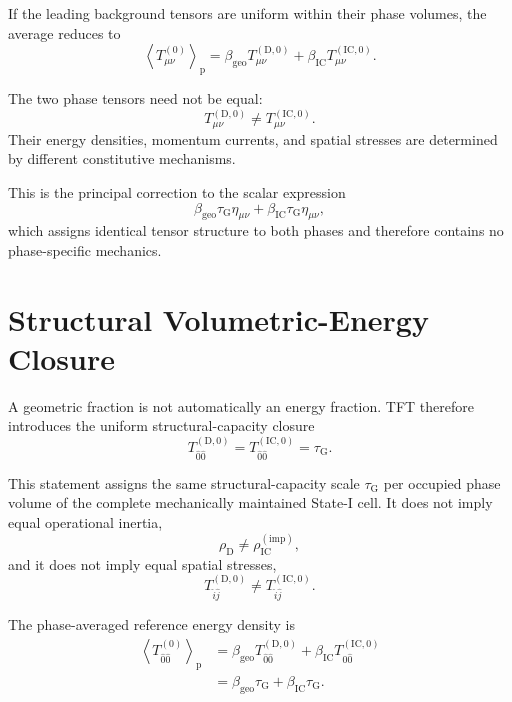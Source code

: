 If the leading background tensors are uniform within their phase volumes, the average reduces to
\begin{equation}
    \left\langle T_{\mu\nu}^{(0)}\right\rangle_{\mathrm{p}} = \beta_{\mathrm{geo}} T_{\mu\nu}^{(\mathrm{D},0)} + \beta_{\mathrm{IC}} T_{\mu\nu}^{(\mathrm{IC},0)}.
\end{equation}

The two phase tensors need not be equal:
\begin{equation}
    T_{\mu\nu}^{(\mathrm{D},0)} \neq T_{\mu\nu}^{(\mathrm{IC},0)}.
\end{equation}
Their energy densities, momentum currents, and spatial stresses are determined by different constitutive mechanisms.

This is the principal correction to the scalar expression
\begin{equation}
    \beta_{\mathrm{geo}}\tau_{\mathrm{G}}\eta_{\mu\nu} + \beta_{\mathrm{IC}}\tau_{\mathrm{G}}\eta_{\mu\nu},
\end{equation}
which assigns identical tensor structure to both phases and therefore contains no phase-specific mechanics.

\section{Structural Volumetric-Energy Closure}

A geometric fraction is not automatically an energy fraction. TFT therefore introduces the uniform structural-capacity closure
\begin{equation}
    T_{\hat{0}\hat{0}}^{(\mathrm{D},0)} = T_{\hat{0}\hat{0}}^{(\mathrm{IC},0)} = \tau_{\mathrm{G}}.
\end{equation}

This statement assigns the same structural-capacity scale $\tau_{\mathrm{G}}$ per occupied phase volume of the complete mechanically maintained State-I cell. It does not imply equal operational inertia,
\begin{equation}
    \rho_{\mathrm{D}} \neq \rho_{\mathrm{IC}}^{(\mathrm{imp})},
\end{equation}
and it does not imply equal spatial stresses,
\begin{equation}
    T_{\hat{i}\hat{j}}^{(\mathrm{D},0)} \neq T_{\hat{i}\hat{j}}^{(\mathrm{IC},0)}.
\end{equation}

The phase-averaged reference energy density is
\begin{equation}
\begin{aligned}
    \left\langle T_{\hat{0}\hat{0}}^{(0)} \right\rangle_{\mathrm{p}} &= \beta_{\mathrm{geo}} T_{\hat{0}\hat{0}}^{(\mathrm{D},0)} + \beta_{\mathrm{IC}} T_{\hat{0}\hat{0}}^{(\mathrm{IC},0)} \\[3pt]
    &= \beta_{\mathrm{geo}}\tau_{\mathrm{G}} + \beta_{\mathrm{IC}}\tau_{\mathrm{G}}.
\end{aligned}
\end{equation}

